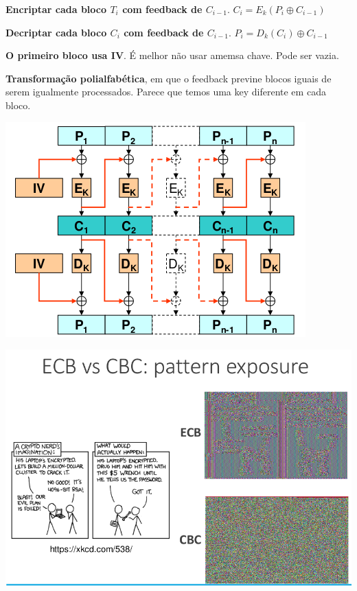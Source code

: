 \documentclass{article}
\begin{document}
\begin{flushleft}
  \textbf{Encriptar cada bloco $T_i$ com feedback de $C_{i-1}$}. $C_i = E_k(P_i \oplus C_{i-1})$

  \vspace{2mm}

  \textbf{Decriptar cada bloco $C_i$ com feedback de $C_{i-1}$}. $P_i = D_k(C_i) \oplus C_{i-1}$

  \vspace{2mm}

  \textbf{O primeiro bloco usa IV}. É melhor não usar amemsa chave. Pode ser
  vazia. 
  
  \vspace{2mm}

  \textbf{Transformação polialfabética}, em que o feedback previne blocos iguais
  de serem igualmente processados. Parece que temos uma key diferente em cada bloco.

  \begin{center}
    \includegraphics[scale=0.3]{83}
  \end{center}
\end{flushleft}

\begin{center}
  \includegraphics[scale=0.3]{84}
\end{center}
\end{document}
